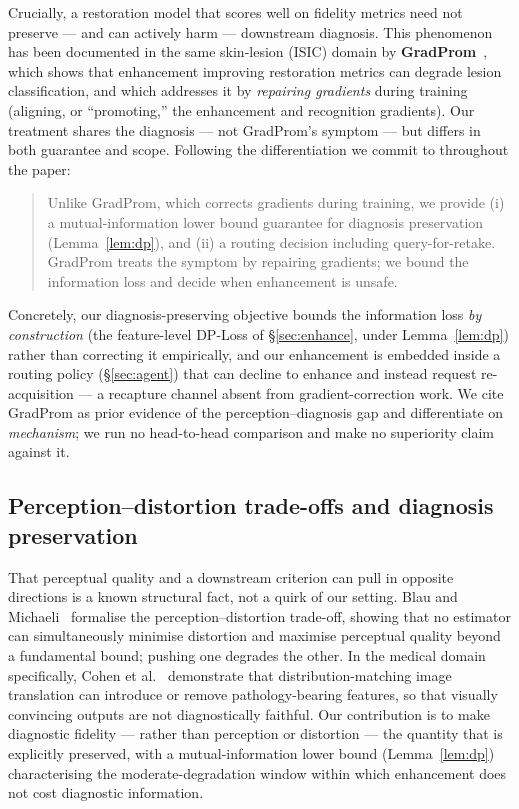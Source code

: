 Crucially, a restoration model that scores well on fidelity metrics need not
preserve --- and can actively harm --- downstream diagnosis. This phenomenon has
been documented in the same skin-lesion (ISIC) domain by
\textbf{GradProm}~\citep{gradprom2025}, which shows that enhancement improving
restoration metrics can degrade lesion classification, and which addresses it by
\emph{repairing gradients} during training (aligning, or ``promoting,'' the
enhancement and recognition gradients). Our treatment shares the diagnosis ---
not GradProm's symptom --- but differs in both guarantee and scope. Following
the differentiation we commit to throughout the paper:
\begin{quote}
Unlike GradProm, which corrects gradients during training, we provide (i) a
mutual-information lower bound guarantee for diagnosis preservation
(Lemma~\ref{lem:dp}), and (ii) a routing decision including query-for-retake.
GradProm treats the symptom by repairing gradients; we bound the information
loss and decide when enhancement is unsafe.
\end{quote}
Concretely, our diagnosis-preserving objective bounds the information loss
\emph{by construction} (the feature-level DP-Loss of \S\ref{sec:enhance},
under Lemma~\ref{lem:dp}) rather than correcting it empirically, and our
enhancement is embedded inside a routing policy
(\S\ref{sec:agent}) that can decline to enhance and instead request
re-acquisition --- a recapture channel absent from gradient-correction work. We
cite GradProm as prior evidence of the perception--diagnosis gap and
differentiate on \emph{mechanism}; we run no head-to-head comparison and make no
superiority claim against it.

\subsection{Perception--distortion trade-offs and diagnosis preservation}
\label{subsec:rel-perception-distortion}

That perceptual quality and a downstream criterion can pull in opposite
directions is a known structural fact, not a quirk of our setting. Blau and
Michaeli~\citep{blau2018perception} formalise the perception--distortion
trade-off, showing that no estimator can simultaneously minimise distortion and
maximise perceptual quality beyond a fundamental bound; pushing one degrades the
other. In the medical domain specifically, Cohen et
al.~\citep{cohen2018distribution} demonstrate that distribution-matching image
translation can introduce or remove pathology-bearing features, so that
visually convincing outputs are not diagnostically faithful. Our contribution is
to make diagnostic fidelity --- rather than perception or distortion --- the
quantity that is explicitly preserved, with a mutual-information lower bound
(Lemma~\ref{lem:dp}) characterising the moderate-degradation window within which
enhancement does not cost diagnostic information.

